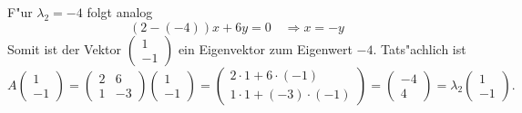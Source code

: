 \begin{loesung}
F"ur $\lambda_2=-4$ folgt analog
\[
(2-(-4))x+6y=0\quad\Rightarrow x=-y
\]
Somit ist der Vektor
$\begin{pmatrix}1\\-1\end{pmatrix}$
ein Eigenvektor zum Eigenwert $-4$. Tats"achlich ist
\[
A
\begin{pmatrix}1\\-1\end{pmatrix}
=
\begin{pmatrix}
2&6\\
1&-3
\end{pmatrix}
\begin{pmatrix}1\\-1\end{pmatrix}
=
\begin{pmatrix}
2\cdot 1 +6\cdot(-1)\\
1\cdot1+(-3)\cdot(-1)
\end{pmatrix}
=
\begin{pmatrix}
-4\\
4
\end{pmatrix}
=\lambda_2
\begin{pmatrix}1\\-1\end{pmatrix}.
\]
\end{loesung}

